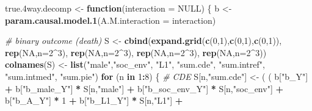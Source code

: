 \documentclass[
]{book}
\newenvironment{Shaded}{\begin{snugshade}}{\end{snugshade}}
\newcommand{\AttributeTok}[1]{\textcolor[rgb]{0.13,0.29,0.53}{#1}}
\newcommand{\CommentTok}[1]{\textcolor[rgb]{0.56,0.35,0.01}{\textit{#1}}}
\newcommand{\ConstantTok}[1]{\textcolor[rgb]{0.56,0.35,0.01}{#1}}
\newcommand{\ControlFlowTok}[1]{\textcolor[rgb]{0.13,0.29,0.53}{\textbf{#1}}}
\newcommand{\DecValTok}[1]{\textcolor[rgb]{0.00,0.00,0.81}{#1}}
\newcommand{\FloatTok}[1]{\textcolor[rgb]{0.00,0.00,0.81}{#1}}
\newcommand{\FunctionTok}[1]{\textcolor[rgb]{0.13,0.29,0.53}{\textbf{#1}}}
\newcommand{\NormalTok}[1]{#1}
\newcommand{\OtherTok}[1]{\textcolor[rgb]{0.56,0.35,0.01}{#1}}
\newcommand{\SpecialCharTok}[1]{\textcolor[rgb]{0.81,0.36,0.00}{\textbf{#1}}}
\newcommand{\StringTok}[1]{\textcolor[rgb]{0.31,0.60,0.02}{#1}}
\begin{document}
\begin{Shaded}
\begin{Highlighting}[]
\NormalTok{true}\FloatTok{.4}\NormalTok{way.decomp }\OtherTok{\textless{}{-}} \ControlFlowTok{function}\NormalTok{(}\AttributeTok{interaction =} \ConstantTok{NULL}\NormalTok{) \{}
\NormalTok{  b }\OtherTok{\textless{}{-}} \FunctionTok{param.causal.model.1}\NormalTok{(}\AttributeTok{A.M.interaction =}\NormalTok{ interaction)}
  
  \CommentTok{\# binary outcome (death)}
\NormalTok{  S }\OtherTok{\textless{}{-}} \FunctionTok{cbind}\NormalTok{(}\FunctionTok{expand.grid}\NormalTok{(}\FunctionTok{c}\NormalTok{(}\DecValTok{0}\NormalTok{,}\DecValTok{1}\NormalTok{),}\FunctionTok{c}\NormalTok{(}\DecValTok{0}\NormalTok{,}\DecValTok{1}\NormalTok{),}\FunctionTok{c}\NormalTok{(}\DecValTok{0}\NormalTok{,}\DecValTok{1}\NormalTok{)), }\FunctionTok{rep}\NormalTok{(}\ConstantTok{NA}\NormalTok{,}\AttributeTok{n=}\DecValTok{2}\SpecialCharTok{\^{}}\DecValTok{3}\NormalTok{), }\FunctionTok{rep}\NormalTok{(}\ConstantTok{NA}\NormalTok{,}\AttributeTok{n=}\DecValTok{2}\SpecialCharTok{\^{}}\DecValTok{3}\NormalTok{), }
             \FunctionTok{rep}\NormalTok{(}\ConstantTok{NA}\NormalTok{,}\AttributeTok{n=}\DecValTok{2}\SpecialCharTok{\^{}}\DecValTok{3}\NormalTok{), }\FunctionTok{rep}\NormalTok{(}\ConstantTok{NA}\NormalTok{,}\AttributeTok{n=}\DecValTok{2}\SpecialCharTok{\^{}}\DecValTok{3}\NormalTok{))}
  \FunctionTok{colnames}\NormalTok{(S) }\OtherTok{\textless{}{-}} \FunctionTok{list}\NormalTok{(}\StringTok{"male"}\NormalTok{,}\StringTok{"soc\_env"}\NormalTok{, }\StringTok{"L1"}\NormalTok{, }\StringTok{"sum.cde"}\NormalTok{, }\StringTok{"sum.intref"}\NormalTok{, }
                      \StringTok{"sum.intmed"}\NormalTok{, }\StringTok{"sum.pie"}\NormalTok{)}
  \ControlFlowTok{for}\NormalTok{ (n }\ControlFlowTok{in} \DecValTok{1}\SpecialCharTok{:}\DecValTok{8}\NormalTok{) \{}
    \CommentTok{\# CDE }
\NormalTok{    S[n,}\StringTok{"sum.cde"}\NormalTok{] }\OtherTok{\textless{}{-}}\NormalTok{ ( ( b[}\StringTok{"b\_Y"}\NormalTok{] }\SpecialCharTok{+} 
\NormalTok{                            b[}\StringTok{"b\_male\_Y"}\NormalTok{] }\SpecialCharTok{*}\NormalTok{ S[n,}\StringTok{"male"}\NormalTok{] }\SpecialCharTok{+} 
\NormalTok{                            b[}\StringTok{"b\_soc\_env\_Y"}\NormalTok{] }\SpecialCharTok{*}\NormalTok{ S[n,}\StringTok{"soc\_env"}\NormalTok{] }\SpecialCharTok{+} 
\NormalTok{                            b[}\StringTok{"b\_A\_Y"}\NormalTok{] }\SpecialCharTok{*} \DecValTok{1} \SpecialCharTok{+} 
\NormalTok{                            b[}\StringTok{"b\_L1\_Y"}\NormalTok{] }\SpecialCharTok{*}\NormalTok{ S[n,}\StringTok{"L1"}\NormalTok{] }\SpecialCharTok{+}

\end{Highlighting}
\end{Shaded}
\end{document}
